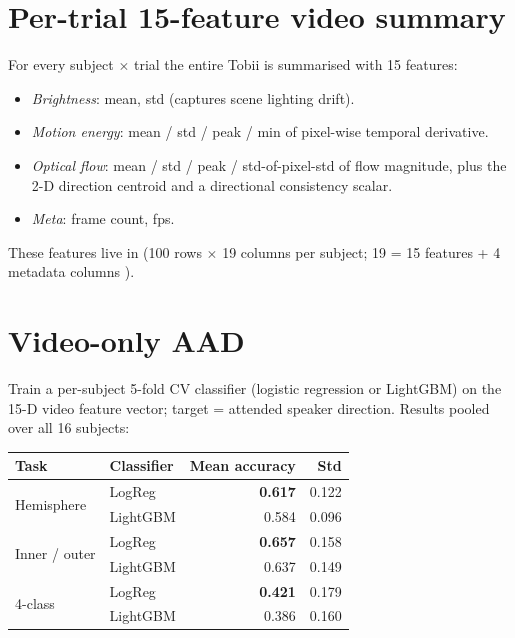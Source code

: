 \section{Per-trial 15-feature video summary}

For every subject $\times$ trial the entire Tobii 
is summarised with 15 features:

\begin{itemize}
  \item \emph{Brightness}: mean, std (captures scene lighting drift).
  \item \emph{Motion energy}: mean / std / peak / min of pixel-wise
        temporal derivative.
  \item \emph{Optical flow}: mean / std / peak / std-of-pixel-std of
        flow magnitude, plus the 2-D direction centroid
         and a directional
        consistency scalar.
  \item \emph{Meta}: frame count, fps.
\end{itemize}

These features live in
(100 rows $\times$ 19 columns per subject; 19 = 15 features + 4
metadata columns ).

\section{Video-only AAD}

Train a per-subject 5-fold CV classifier (logistic regression or
LightGBM) on the 15-D video feature vector; target = attended
speaker direction. Results pooled over all 16 subjects:

\begin{table}[ht]
\centering
\begin{tabular}{llrr}
\toprule
Task & Classifier & Mean accuracy & Std \\
\midrule
\multirow{2}{*}{Hemisphere}    & LogReg   & \textbf{0.617} & 0.122 \\
                               & LightGBM & 0.584 & 0.096 \\
\multirow{2}{*}{Inner / outer} & LogReg   & \textbf{0.657} & 0.158 \\
                               & LightGBM & 0.637 & 0.149 \\
\multirow{2}{*}{4-class}       & LogReg   & \textbf{0.421} & 0.179 \\
                               & LightGBM & 0.386 & 0.160 \\
\bottomrule
\end{tabular}
\end{table}

